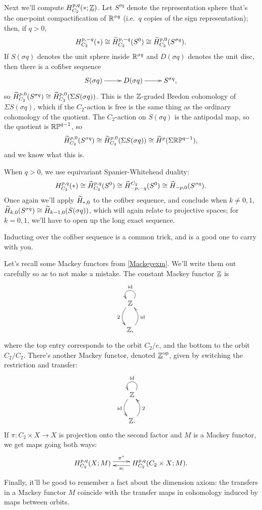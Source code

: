Next we'll compute $H_{C_2}^{p,q}(*;\underline{\mathbb Z})$. Let $S^{\sigma q}$ denote the representation sphere that's the
one-point compactification of $\mathbb R^{\sigma q}$ (i.e.\ $q$ copies of the sign representation); then, if $q >
0$,
\[H_{C_2}^{p,-q}(*)\cong \widetilde H_{C_2}^{p,-q}(S^0)\cong \widetilde H_{C_2}^{p,0}(S^{\sigma q}).\]
If $S(\sigma q)$ denotes the unit sphere inside $\mathbb R^{\sigma q}$ and $D(\sigma q)$ denotes the unit disc, then there
is a cofiber sequence
\begin{equation}
\label{signed_cofiber}
\xymatrix{
	S(\sigma q)\ar[r] & D(\sigma q)\ar[r] & S^{\sigma q},
}
\end{equation}
so $\widetilde H_{C_2}^{p,0}(S^{\sigma q})\cong\widetilde H_{C_2}^{p,0}(\Sigma S(\sigma q))$. This is the $\mathbb Z$-graded Bredon
cohomology of $\Sigma S(\sigma q)$, which if the $C_2$-action is free is the same thing as the ordinary cohomology
of the quotient. The $C_2$-action on $S(\sigma q)$ is the antipodal map, so the quotient is $\mathbb{RP}^{q-1}$, so
\[\widetilde H_{C_2}^{p,0}(S^{\sigma q})\cong \widetilde H_{C_2}^{p,0}(\Sigma S(\sigma q))\cong \widetilde H^p(\Sigma\mathbb{RP}^{q-1}),\]
and we know what this is.

When $q > 0$, we use equivariant Spanier-Whitehead duality:
\[H_{C_2}^{p,q}(*)\cong \widetilde H_{C_2}^{p,q}(S^0)\cong \widetilde H_{-p,-q}^{C_2}(S^0)\cong \widetilde H_{-p,0}(S^{\sigma q}).\]
Once again we'll apply $\widetilde H_{*,0}$ to the cofiber sequence, and conclude when $k\ne 0,1$, $\widetilde H_{k,0}(S^{\sigma
q})\cong \widetilde H_{k-1,0}(S(\sigma q))$, which will again relate to projective spaces; for $k = 0,1$, we'll have to open
up the long exact sequence.

Inducting over the cofiber sequence is a common trick, and is a good one to carry with you.

Let's recall some Mackey functors from \cref{Mackeyexm}. We'll write them out carefully so as to not make a
mistake. The constant Mackey functor $\underline{\mathbb Z}$ is
\[\xymatrix{
	\Z\ar@/_0.4cm/[d]_2\ar@(ur,ul)_\id\\
	\Z,\ar@/_0.4cm/[u]_\id
}\]
where the top entry corresponds to the orbit $C_2/e$, and the bottom to the orbit $C_2/C_2$. There's another Mackey
functor, denoted $\underline{\mathbb Z}^{\mathrm{op}}$, given by switching the restriction and transfer:
\[\xymatrix{
	\Z\ar@/_0.4cm/[d]_\id\ar@(ur,ul)_\id\\
	\Z.\ar@/_0.4cm/[u]_2
}\]
If $\pi\colon C_2\times X\to X$ is projection onto the second factor and $M$ is a Mackey functor, we get maps going
both ways:
\[\xymatrix{
	H_{C_2}^{p,q}(X;M)\ar@<0.1cm>[r]^-{\pi^*} & H_{C_2}^{p,q}(C_2\times X; M).\ar@<0.1cm>[l]^-{\pi_!}
}\]
Finally, it'll be good to remember a fact about the dimension axiom: the transfers in a Mackey functor $M$ coincide
with the transfer maps in cohomology induced by maps between orbits.

